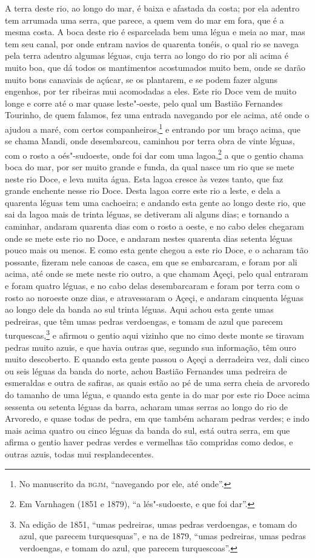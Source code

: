 A terra deste rio, ao longo do mar, é baixa e afastada da costa; por ela adentro tem
arrumada uma serra, que parece, a quem vem do mar em fora, que é a mesma costa. A boca
deste rio é esparcelada bem uma légua e meia ao mar, mas tem seu canal, por onde entram
navios de quarenta tonéis, o qual rio se navega pela terra adentro algumas léguas, cuja
terra ao longo do rio por ali acima é muito boa, que dá todos os mantimentos acostumados
muito bem, onde se darão muito bons canaviais de açúcar, se os plantarem, e se podem fazer
alguns engenhos, por ter ribeiras mui acomodadas a eles. Este rio Doce vem de muito longe
e corre até o mar quase leste"-oeste, pelo qual um Bastião Fernandes Tourinho, de quem
falamos, fez uma entrada navegando por ele acima, até onde o ajudou a maré, com certos
companheiros,\footnote{ No manuscrito da \textsc{bgjm}, ``navegando por ele, até onde''.}
e entrando por um braço acima, que se chama Mandi, onde desembarcou, caminhou por terra
obra de vinte léguas, com o rosto a oés"-sudoeste, onde foi dar com uma lagoa,\footnote{ Em
Varnhagen (1851 e 1879), ``a lés"-sudoeste, e que foi dar''.} a que o gentio chama boca do
mar, por ser muito grande e funda, da qual nasce um rio que se mete neste rio Doce, e leva
muita água. Esta lagoa cresce às vezes tanto, que faz grande enchente nesse rio Doce.
Desta lagoa corre este rio a leste, e dela a quarenta léguas tem uma cachoeira; e andando
esta gente ao longo deste rio, que sai da lagoa mais de trinta léguas, se detiveram ali
alguns dias; e tornando a caminhar, andaram quarenta dias com o rosto a oeste, e no cabo
deles chegaram onde se mete este rio no Doce, e andaram nestes quarenta dias setenta
léguas pouco mais ou menos. E como esta gente chegou a este rio Doce, e o acharam tão
possante, fizeram nele canoas de casca, em que se embarcaram, e foram por ali acima, até
onde se mete neste rio outro, a que chamam Açeçi, pelo qual entraram e foram quatro
léguas, e no cabo delas desembarcaram e foram por terra com o rosto ao noroeste onze dias,
e atravessaram o Açeçi, e andaram cinquenta léguas ao longo dele da banda ao sul trinta
léguas. Aqui achou esta gente umas pedreiras, que têm umas pedras verdoengas, e tomam de
azul que parecem turquescas,\footnote{ Na edição de 1851, ``umas pedreiras, umas pedras
verdoengas, e tomam do azul, que parecem turquesquas'', e na de 1879, ``umas pedreiras,
umas pedras verdoengas, e tomam do azul, que parecem turquescoas''.} e afirmou o gentio
aqui vizinho que no cimo deste monte se tiravam pedras muito azuis, e que havia outras
que, segundo sua informação, têm ouro muito descoberto. E quando esta gente passou o Açeçi
a derradeira vez, dali cinco ou seis léguas da banda do norte, achou Bastião Fernandes uma
pedreira de esmeraldas e outra de safiras, as quais estão ao pé de uma serra cheia de
arvoredo do tamanho de uma légua, e quando esta gente ia do mar por este rio Doce acima
sessenta ou setenta léguas da barra, acharam umas serras ao longo do rio de Arvoredo, e
quase todas de pedra, em que também acharam pedras verdes; e indo mais acima quatro ou
cinco léguas da banda do sul, está outra serra, em que afirma o gentio haver pedras verdes
e vermelhas tão compridas como dedos, e outras azuis, todas mui resplandecentes.

